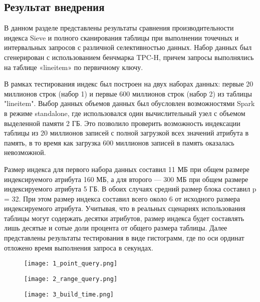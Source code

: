 \subsection{Результат внедрения}
В данном разделе представлены результаты сравнения производительности индекса Sieve и полного сканирования таблицы при выполнении точечных и интервальных запросов с различной селективностью данных. Набор данных был сгенерирован с использованием бенчмарка TPC-H, причем запросы выполнялись на таблице «lineitem» по первичному ключу.

В рамках тестирования индекс был построен на двух наборах данных: первые 20 миллионов строк (набор 1) и первые 600 миллионов строк (набор 2) из таблицы "lineitem". Выбор данных объемов данных был обусловлен возможностями Spark в режиме standalone, где использовался один вычислительный узел с объемом выделенной памяти 2 ГБ. Это позволило проверить возможность индексации таблицы из 20 миллионов записей с полной загрузкой всех значений атрибута в память, в то время как загрузка 600 миллионов записей в память оказалась невозможной.

Размер индекса для первого набора данных составил 11 МБ при общем размере индексируемого атрибута 160 МБ, а для второго — 300 МБ при общем размере индексируемого атрибута 5 ГБ. В обоих случаях средний размер блока составил p = 32. При этом размер индекса составил всего около 6 от исходного размера индексируемого атрибута. Учитывая, что в реальных сценариях использования таблицы могут содержать десятки атрибутов, размер индекса будет составлять лишь десятые и сотые доли процента от общего размера таблицы.
Далее представлены результаты тестирования в виде гистограмм, где по оси ординат отложено время выполнения запроса в секундах.

\begin{figure}[h]
    \centering
    \texttt{[image: 1\_point\_query.png]}
    \caption{}
\end{figure}


\begin{figure}[p]
    \centering
    \texttt{[image: 2\_range\_query.png]}
    \caption{}
\end{figure}

\begin{figure}[p]
    \centering
    \texttt{[image: 3\_build\_time.png]}
    \caption{}
\end{figure}

